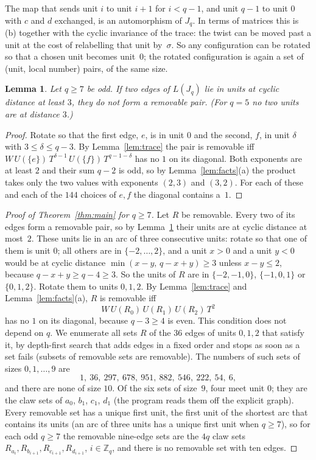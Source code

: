 \documentclass[11pt]{amsart}
\newtheorem{lemma}[theorem]{Lemma}
\theoremstyle{remark}
\begin{document}
The map that sends unit $i$ to unit $i+1$ for $i<q-1$, and unit $q-1$ to unit $0$ with $c$ and $d$ exchanged,
is an automorphism of $J_q$. In terms of matrices this is (b) together with the cyclic invariance of the trace:
the twist can be moved past a unit at the cost of relabelling that unit by~$\sigma$. So any configuration can be
rotated so that a chosen unit becomes unit~$0$; the rotated configuration is again a set of (unit, local number)
pairs, of the same size.

\begin{lemma}\label{lem:far}
Let $q\ge7$ be odd. If two edges of $L(J_q)$ lie in units at cyclic distance at least $3$, they do not form a
removable pair. (For $q=5$ no two units are at distance $3$.)
\end{lemma}
\begin{proof}
Rotate so that the first edge, $e$, is in unit $0$ and the second, $f$, in unit $\delta$ with $3\le\delta\le q-3$.
By Lemma~\ref{lem:trace} the pair is removable iff
$W\,U(\{e\})\,T^{\delta-1}\,U(\{f\})\,T^{q-1-\delta}$ has no $1$ on its diagonal. Both exponents are at least $2$ and
their sum $q-2$ is odd, so by Lemma~\ref{lem:facts}(a) the product takes only the two values with exponents
$(2,3)$ and $(3,2)$. For each of these and each of the $144$ choices of $e,f$ the diagonal contains a~$1$.
\end{proof}

\begin{proof}[Proof of Theorem~\ref{thm:main} for $q\ge7$]
Let $R$ be removable. Every two of its edges form a removable pair, so by Lemma~\ref{lem:far} their units are at
cyclic distance at most~$2$. These units lie in an arc of three consecutive units: rotate so that one of them is
unit $0$; all others are in $\{-2,\dots,2\}$, and a unit $x>0$ and a unit $y<0$ would be at cyclic distance
$\min(x-y,\,q-x+y)\ge3$ unless $x-y\le2$, because $q-x+y\ge q-4\ge3$. So the units of $R$ are in $\{-2,-1,0\}$,
$\{-1,0,1\}$ or $\{0,1,2\}$. Rotate them to units $0,1,2$. By Lemma~\ref{lem:trace} and Lemma~\ref{lem:facts}(a), $R$ is removable iff
\[W\,U(R_0)\,U(R_1)\,U(R_2)\,T^2\]
has no $1$ on its diagonal, because $q-3\ge4$ is even. This condition does not depend on $q$. We enumerate all
sets $R$ of the $36$ edges of units $0,1,2$ that satisfy it, by depth-first search that adds edges in a fixed order
and stops as soon as a set fails (subsets of removable sets are removable). The numbers of such sets of sizes
$0,1,\dots,9$ are
\[1,\ 36,\ 297,\ 678,\ 951,\ 882,\ 546,\ 222,\ 54,\ 6,\]
and there are none of size $10$. Of the six sets of size~$9$, four meet unit $0$; they are the claw sets of $a_0$,
$b_1$, $c_1$, $d_1$ (the program reads them off the explicit graph). Every removable set has a unique first unit,
the first unit of the shortest arc that contains its units (an arc of three units has a unique first unit
when $q\ge7$), so for each odd $q\ge7$ the removable nine-edge sets are the $4q$ claw sets
$R_{a_i},R_{b_{i+1}},R_{c_{i+1}},R_{d_{i+1}}$, $i\in\mathbb Z_q$, and there is no removable set with ten edges.
\end{proof}
\end{document}
